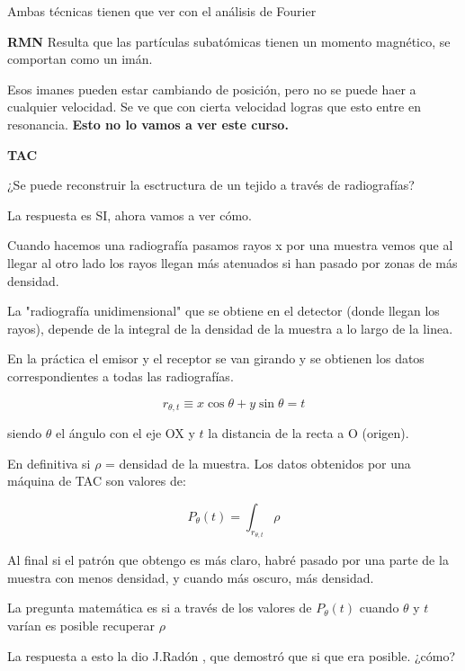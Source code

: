 	Ambas técnicas tienen que ver con el análisis de Fourier

	\textbf{RMN} Resulta que las partículas subatómicas tienen un momento magnético, se comportan como un imán.

	Esos imanes pueden estar cambiando de posición, pero no se puede haer a cualquier velocidad.
	Se ve que con cierta velocidad logras que esto entre en resonancia. \textbf{Esto no lo vamos a ver este curso.}

	\textbf{TAC}

	¿Se puede reconstruir la esctructura de un tejido a través de radiografías?

	La respuesta es SI, ahora vamos a ver cómo.


	Cuando hacemos una radiografía pasamos rayos x por una muestra vemos que al llegar al otro lado los rayos llegan más atenuados si han pasado por zonas de más densidad.

	La "radiografía unidimensional" que se obtiene en el detector (donde llegan los rayos), depende de la integral de la densidad de la muestra a lo largo de la linea.

	En la práctica el emisor y el receptor se van girando y se obtienen los datos correspondientes a todas las radiografías.

	$$r_{\theta , t} \equiv x \cos\theta + y\sin\theta = t$$

	\begin{center}
		\centering
	\end{center}

	siendo $\theta$ el ángulo con el eje OX y $t$ la distancia de la recta a O (origen).

	 \begin{center}
		\centering
	\end{center}


En definitiva si $\rho$ = densidad de la muestra. Los datos obtenidos por una máquina de TAC son valores de:

$$P_{\theta} (t) = \int_{r_{\theta , t}} \rho$$

Al final si el patrón que obtengo es más claro, habré pasado por una parte de la muestra con menos densidad, y cuando más oscuro, más densidad.

La pregunta matemática es si a través de los valores de $P_{\theta}(t)$ cuando $\theta$ y $t$ varían es posible recuperar $\rho$

La respuesta a esto la dio J.Radón , que demostró que si que era posible. ¿cómo?

